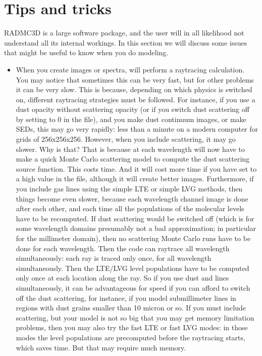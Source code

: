 \documentclass[letterpaper,10pt,english]{sphinxmanual}
\begin{document}
\section{Tips and tricks}
\label{\detokenize{tipsandtricks:tips-and-tricks}}
RADMC\sphinxhyphen{}3D is a large software package, and the user will in all
likelihood not understand all its internal workings. In this section we will
discuss some issues that might be useful to know when you do modeling.
\begin{itemize}
\item {} 

When you create images or spectra,  will perform a ray\sphinxhyphen{}tracing
calculation. You may notice that sometimes this can be very fast, but for
other problems it can be very slow. This is because, depending on which
physics is switched on, different ray\sphinxhyphen{}tracing strategies must be followed. For
instance, if you use a dust opacity without scattering opacity (or if you
switch dust scattering off by setting  to 0 in the
 file), and you make dust continuum images, or make SEDs, this
may go very rapidly: less than a minute on a modern computer for grids of
256x256x256. However, when you include scattering, it may go slower. Why is
that? That is because at each wavelength  will now have to make a
quick Monte Carlo scattering model to compute the dust scattering source
function. This costs time. And it will cost more time if you have
 set to a high value in the  file, although it
will create better images. Furthermore, if you  include gas lines using
the simple LTE or simple LVG methods, then things become even slower, because
each wavelength channel image is done after each other, and each time all the
populations of the molecular levels have to be re\sphinxhyphen{}computed. If dust scattering
would be switched off (which is for some wavelength domains presumably not a
bad approximation; in particular for the millimeter domain), then no
scattering Monte Carlo runs have to be done for each wavelength. Then the code
can ray\sphinxhyphen{}trace all wavelength simultaneously: each ray is traced only once, for
all wavelength simultaneously. Then the LTE/LVG level populations have to be
computed only once at each location along the ray.  So if you use dust and
lines simultaneously, it can be advantageous for speed if you can afford to
switch off the dust scattering, for instance, if you model sub\sphinxhyphen{}millimeter
lines in regions with dust grains smaller than 10 micron or so. If you must
include scattering, but your model is not so big that you may get memory
limitation problems, then you may also try the fast LTE or fast LVG modes: in
those modes the level populations are pre\sphinxhyphen{}computed before the ray\sphinxhyphen{}tracing
starts, which saves time. But that may require much memory.

\end{itemize}
\end{document}
